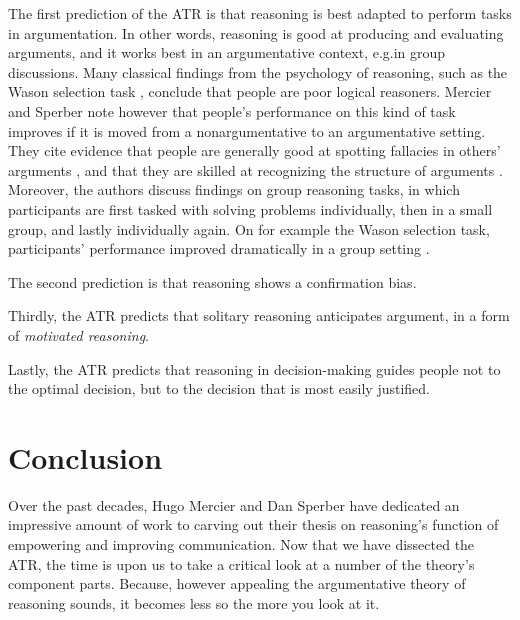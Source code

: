 The first prediction of the ATR is that reasoning is best adapted to perform tasks in argumentation. In other words, reasoning is good at producing and evaluating arguments, and it works best in an argumentative context, e.g.\@ in group discussions.
Many classical findings from the psychology of reasoning, such as the Wason selection task \citep{Wason68}, conclude that people are poor logical reasoners. Mercier and Sperber note however that people's performance on this kind of task improves if it is moved from a nonargumentative to an argumentative setting. They cite evidence that people are generally good at spotting fallacies in others' arguments , and that they are skilled at recognizing the structure of arguments .
Moreover, the authors discuss findings on group reasoning tasks, in which participants are first tasked with solving problems individually, then in a small group, and lastly individually again. On for example the Wason selection task, participants' performance improved dramatically in a group setting \citep{Moshman98} .

The second prediction is that reasoning shows a confirmation bias.

Thirdly, the ATR predicts that solitary reasoning anticipates argument, in a form of \emph{motivated reasoning}.

Lastly, the ATR predicts that reasoning in decision-making guides people not to the optimal decision, but to the decision that is most easily justified.

\section{Conclusion}

Over the past decades, Hugo Mercier and Dan Sperber have dedicated an impressive amount of work to carving out their thesis on reasoning's function of empowering and improving communication.
Now that we have dissected the ATR, the time is upon us to take a critical look at a number of the theory's component parts.
Because, however appealing the argumentative theory of reasoning sounds, it becomes less so the more you look at it.
